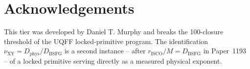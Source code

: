 \documentclass[11pt]{article}
\newcommand{\Dphys}{D_{\mathrm{phys}}}
\newcommand{\Dbsfg}{D_{\mathrm{BSFG}}}
\begin{document}
\section*{Acknowledgements}
This tier was developed by Daniel T. Murphy and breaks the
100-closure threshold of the UQFF locked-primitive program.  The
identification $\nu_{\text{XY}}=\Dphys/\Dbsfg$ is a second instance --
after $r_{\text{ISCO}}/M=\Dbsfg$ in Paper~1193 -- of a locked
primitive serving directly as a measured physical exponent.
\end{document}
